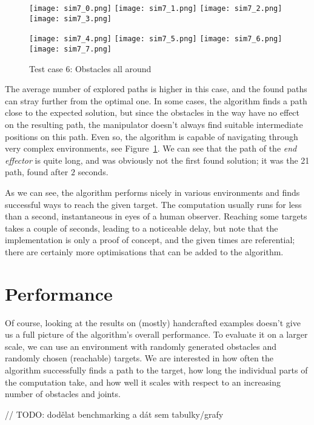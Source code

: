 \begin{figure}[h]
  \centering
  \begin{minipage}{\textwidth}
    \texttt{[image: sim7\_0.png]}
    \texttt{[image: sim7\_1.png]}
    \texttt{[image: sim7\_2.png]}
    \texttt{[image: sim7\_3.png]}

    \texttt{[image: sim7\_4.png]}
    \texttt{[image: sim7\_5.png]}
    \texttt{[image: sim7\_6.png]}
    \texttt{[image: sim7\_7.png]}
  \end{minipage}
  \caption{Test case 6: Obstacles all around}\label{fig:sim7}
\end{figure}

The average number of explored paths is higher in this case, and the found paths can stray further from the optimal one. In some cases, the algorithm finds a path close to the expected solution, but since the obstacles in the way have no effect on the resulting path, the manipulator doesn't always find suitable intermediate positions on this path. Even so, the algorithm is capable of navigating through very complex environments, see Figure~\ref{fig:sim7}. We can see that the path of the \textit{end effector} is quite long, and was obviously not the first found solution; it was the 21\st{} path, found after $2$ seconds.

As we can see, the algorithm performs nicely in various environments and finds successful ways to reach the given target. The computation usually runs for less than a second, instantaneous in eyes of a human observer. Reaching some targets takes a couple of seconds, leading to a noticeable delay, but note that the implementation is only a proof of concept, and the given times are referential; there are certainly more optimisations that can be added to the algorithm.

\section{Performance}

Of course, looking at the results on (mostly) handcrafted examples doesn't give us a full picture of the algorithm's overall performance. To evaluate it on a larger scale, we can use an environment with randomly generated obstacles and randomly chosen (reachable) targets. We are interested in how often the algorithm successfully finds a path to the target, how long the individual parts of the computation take, and how well it scales with respect to an increasing number of obstacles and joints.

// TODO: dodělat benchmarking a dát sem tabulky/grafy
